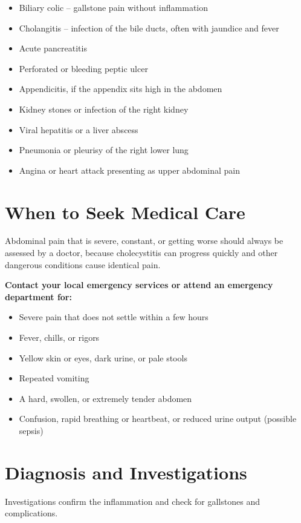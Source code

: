 \begin{itemize}
    \item Biliary colic -- gallstone pain without inflammation
    \item Cholangitis -- infection of the bile ducts, often with jaundice and fever
    \item Acute pancreatitis
    \item Perforated or bleeding peptic ulcer
    \item Appendicitis, if the appendix sits high in the abdomen
    \item Kidney stones or infection of the right kidney
    \item Viral hepatitis or a liver abscess
    \item Pneumonia or pleurisy of the right lower lung
    \item Angina or heart attack presenting as upper abdominal pain
\end{itemize}

\section*{When to Seek Medical Care}
Abdominal pain that is severe, constant, or getting worse should always be assessed by a doctor, because cholecystitis can progress quickly and other dangerous conditions cause identical pain.

\textbf{Contact your local emergency services or attend an emergency department for:}
\begin{itemize}
    \item Severe pain that does not settle within a few hours
    \item Fever, chills, or rigors
    \item Yellow skin or eyes, dark urine, or pale stools
    \item Repeated vomiting
    \item A hard, swollen, or extremely tender abdomen
    \item Confusion, rapid breathing or heartbeat, or reduced urine output (possible sepsis)
\end{itemize}

\section*{Diagnosis and Investigations}
Investigations confirm the inflammation and check for gallstones and complications.

